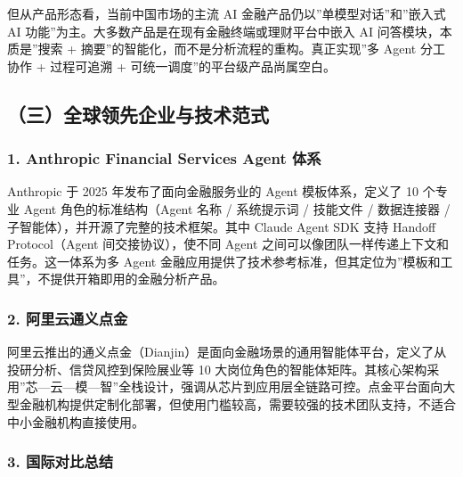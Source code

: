 \documentclass[
]{ctexart}
\begin{document}
但从产品形态看，当前中国市场的主流 AI
金融产品仍以''单模型对话''和''嵌入式 AI
功能''为主。大多数产品是在现有金融终端或理财平台中嵌入 AI
问答模块，本质是''搜索 +
摘要''的智能化，而不是分析流程的重构。真正实现''多 Agent 分工协作 +
过程可追溯 + 可统一调度''的平台级产品尚属空白。

\subsection{（三）全球领先企业与技术范式}\label{ux4e09ux5168ux7403ux9886ux5148ux4f01ux4e1aux4e0eux6280ux672fux8303ux5f0f}

\subsubsection{1. Anthropic Financial Services Agent
体系}\label{anthropic-financial-services-agent-ux4f53ux7cfb}

Anthropic 于 2025 年发布了面向金融服务业的 Agent 模板体系，定义了 10
个专业 Agent 角色的标准结构（Agent 名称 / 系统提示词 / 技能文件 /
数据连接器 / 子智能体），并开源了完整的技术框架。其中 Claude Agent SDK
支持 Handoff Protocol（Agent 间交接协议），使不同 Agent
之间可以像团队一样传递上下文和任务。这一体系为多 Agent
金融应用提供了技术参考标准，但其定位为''模板和工具''，不提供开箱即用的金融分析产品。

\subsubsection{2.
阿里云通义点金}\label{ux963fux91ccux4e91ux901aux4e49ux70b9ux91d1}

阿里云推出的通义点金（Dianjin）是面向金融场景的通用智能体平台，定义了从投研分析、信贷风控到保险展业等
10
大岗位角色的智能体矩阵。其核心架构采用''芯---云---模---智''全栈设计，强调从芯片到应用层全链路可控。点金平台面向大型金融机构提供定制化部署，但使用门槛较高，需要较强的技术团队支持，不适合中小金融机构直接使用。

\subsubsection{3.
国际对比总结}\label{ux56fdux9645ux5bf9ux6bd4ux603bux7ed3}
\end{document}
